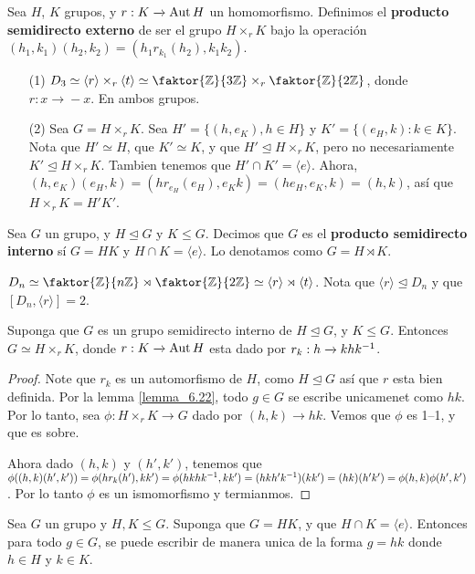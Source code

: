 \begin{definition}
    Sea $H$,  $K$ grupos, y  $r:K \xrightarrow{} \operatorname{Aut}{H}$ un homomorfismo.
    Definimos el \textbf{producto semidirecto externo} de ser el grupo $H
    \times_r K$ bajo la operaci\'on
    $(h_1,k_1)(h_2,k_2)=(h_1r_{k_1}(h_2),k_1k_2)$.
\end{definition}

\begin{example}\label{}
    \begin{enumerate}
        \item[(1)] $D_3 \simeq \langle r \rangle \times_r \langle t \rangle
            \simeq \faktor{\Z}{3\Z} \times_r \faktor{\Z}{2\Z}$, donde $r:x
            \xrightarrow{} -x$. En ambos grupos.

        \item[(2)] Sea $G=H \times_r K$. Sea  $H'=\{(h,e_K), h \in H\}$ y
            $K'=\{(e_H,k): k \in K\}$. Nota que $H' \simeq H$, que  $K' \simeq
            K$, y que  $H' \unlhd H \times_r K$, pero no necesariamente  $K'
            \unlhd H \times_r K$. Tambien tenemos que $H' \cap K'=\langle e
            \rangle$. Ahora, $(h,e_K)(e_H,k)=(hr_{e_H}(e_H),
            e_Kk)=(he_H,e_K,k)=(h,k)$, as\'i que $H \times_r K =H'K'$.
    \end{enumerate}
\end{example}

\begin{definition}
    Sea $G$ un grupo, y  $H \unlhd G$ y  $K \leq G$. Decimos que  $G$ es el
     \textbf{producto semidirecto interno} s\'i $G=HK$ y  $H \cap K=\langle e
     \rangle$. Lo denotamos como $G=H \rtimes K$.
\end{definition}

\begin{example}\label{}
    $D_n \simeq \faktor{\Z}{n\Z} \rtimes \faktor{\Z}{2\Z} \simeq \langle r
    \rangle \rtimes \langle t \rangle$. Nota que $\langle r \rangle \unlhd D_n$
    y que $[D_n,\langle r \rangle]=2$.
\end{example}

\begin{lemma}\label{lemma_6.24}
    Suponga que $G$ es un grupo semidirecto interno de  $H \unlhd G$, y  $K \leq
    G$. Entonces  $G \simeq H \times_r K$, donde  $r:K \xrightarrow{} \operatorname{Aut}{H}$
    esta dado por $r_k:h \xrightarrow{} khk^{-1}$.
\end{lemma}
\begin{proof}
    Note que $r_k$ es un automorfismo de $H$, como $H \unlhd G$ as\'i que $r$
    esta bien definida. Por la lemma \ref{lemma_6.22}, todo $g \in G$ se escribe
    unicamenet como  $hk$. Por lo tanto, sea  $\phi:H \times_r K \xrightarrow{}
    G$ dado por $(h,k) \xrightarrow{} hk$. Vemos que $\phi$ es 1--1, y que es
    sobre.

    Ahora dado $(h,k)$ y $(h',k')$, tenemos que
    $\phi((h,k)(h',k'))=\phi(hr_k(h'),kk')=\phi(hkhk^{-1},
    kk')=(hkh'k^{-1})(kk')=(hk)(h'k')=\phi(h,k)\phi(h',k')$. Por lo tanto
    $\phi$ es un ismomorfismo y termianmos.
\end{proof}

\begin{lemma}\label{lemma_6.25}
    Sea $G$ un grupo y  $H,K \leq G$. Suponga que  $G=HK$, y que  $H \cap
    K=\langle e \rangle$. Entonces para todo $g \in G$, se puede escribir de
    manera unica de la forma  $g=hk$ donde  $h \in H$ y  $k \in K$.
\end{lemma}
